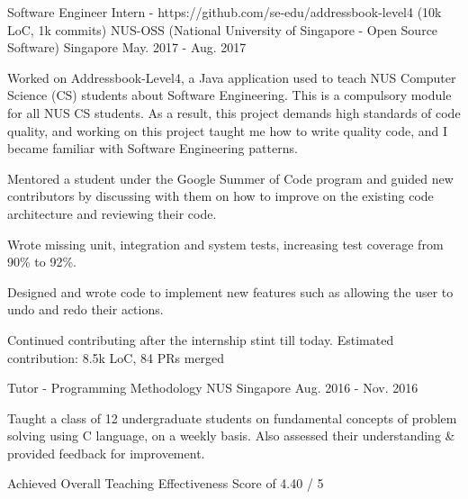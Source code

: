 

\begin{cventries}

  \cventry
    {Software Engineer Intern - https://github.com/se-edu/addressbook-level4 (10k LoC, 1k commits)} %
    {NUS-OSS (National University of Singapore - Open Source Software)} %
    {Singapore} %
    {May. 2017 - Aug. 2017} %
    {
      \begin{cvitems} %
        \item {Worked on Addressbook-Level4, a Java application used to teach NUS Computer Science (CS) students about Software Engineering. This is a compulsory module for all NUS CS students. As a result, this project demands high standards of code quality, and working on this project taught me how to write quality code, and I became familiar with Software Engineering patterns.}
        \item {Mentored a student under the Google Summer of Code program and guided new contributors by discussing with them on how to improve on the existing code architecture and reviewing their code.}
        \item {Wrote missing unit, integration and system tests, increasing test coverage from 90\% to 92\%.}
        \item {Designed and wrote code to implement new features such as allowing the user to undo and redo their actions.}
        \item {Continued contributing after the internship stint till today. Estimated contribution: 8.5k LoC, 84 PRs merged}
      \end{cvitems}
    }
 

  \cventry
    {Tutor - Programming Methodology} %
    {NUS} %
    {Singapore} %
    {Aug. 2016 - Nov. 2016} %
    {
      \begin{cvitems} %
        \item {Taught a class of 12 undergraduate students on fundamental concepts of problem solving using C language, on a weekly basis. Also assessed their understanding \& provided feedback for improvement.}
        \item {Achieved Overall Teaching Effectiveness Score of 4.40 / 5}
      \end{cvitems}
    }

\end{cventries}
